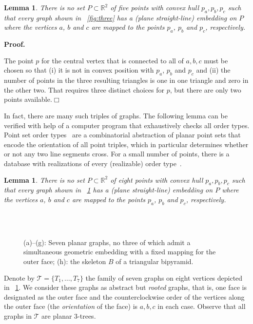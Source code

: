 \documentclass[11pt]{article}
\newtheorem{lemma}[equation]{Lemma}
\newcommand{\qed}{\hfill\ensuremath{\Box}}
\newenvironment{proof}{\noindent\textbf{Proof.}
}{\par\medskip}
\newcommand{\R}{\ensuremath{\mathds R}}
\begin{document}
\begin{lemma}\label{prop:three}
  There is no set $P\subset\R^2$ of five points with convex hull $p_a,p_b,p_c$
  such that every graph shown in \figurename~\ref{fig:three} has a (plane
  straight-line) embedding on $P$ where the vertices $a$, $b$ and $c$ are mapped
  to the points $p_a$, $p_b$ and $p_c$, respectively.
\end{lemma}
\begin{proof}
  The point $p$ for the central vertex that is connected to all of $a,b,c$ must
  be chosen so that (i) it is not in convex position with $p_a$, $p_b$ and $p_c$
  and (ii) the number of points in the three resulting triangles is one in one
  triangle and zero in the other two. That requires three distinct choices for
  $p$, but there are only two points available.\qed
\end{proof}
In fact, there are many such triples of graphs. The following lemma can be
verified with help of a computer program that exhaustively checks all order
types. Point set order types~\cite{gp-ms-83} are a combinatorial abstraction of
planar point sets that encode the orientation of all point triples, which in
particular determines whether or not any two line segments cross. For a small
number of points, there is a database with realizations of every (realizable)
order type~\cite{ak-psotd-01}.
\begin{lemma}\label{prop:seven}
  There is no set $P\subset\R^2$ of eight points with convex hull $p_a,p_b,p_c$
  such that every graph shown in \figurename~\ref{fig:seven} has a (plane
  straight-line) embedding on $P$ where the vertices $a$, $b$ and $c$ are mapped
  to the points $p_a$, $p_b$ and $p_c$, respectively.
\end{lemma}
\begin{figure}[htbp]
  \hfil \subfloat[$T_1$]{\texttt{[image: 8-7-1]}}\hfil \subfloat[$T_2$]{\texttt{[image: 8-7-7]}}\hfil \subfloat[$T_3$]{\texttt{[image: 8-7-4]}}\hfil \subfloat[$T_4$]{\texttt{[image: 8-7-5]}}\hfil\\
  \hspace*{1pt}\hfil \subfloat[$T_5$]{\texttt{[image: 8-7-2]}}\hfil \subfloat[$T_6$]{\texttt{[image: 8-7-6]}}\hfil \subfloat[$T_7$]{\texttt{[image: 8-7-3]}}\hfil {}\\\caption{\label{fig:seven}{\small (a)--(g)}: Seven planar graphs, no three of
    which admit a simultaneous geometric embedding with a fixed mapping for the
    outer face; {\small (h)}: the skeleton $B$ of a triangular bipyramid.}
\end{figure}
Denote by $\mathcal{T}=\{T_1,\ldots,T_7\}$ the family of seven graphs on eight
vertices depicted in \figurename~\ref{fig:seven}. We consider these graphs as
abstract but \emph{rooted} graphs, that is, one face is designated as the outer
face and the counterclockwise order of the vertices along the outer face (the
\emph{orientation} of the face) is $a,b,c$ in each case. Observe that all graphs
in $\mathcal{T}$ are planar 3-trees.
\end{document}

